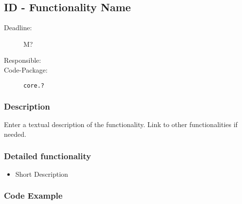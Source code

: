 \newpage
\subsection{ID - Functionality Name}
\label{Functionality:ID}

\begin{description}
\item[Deadline:] M?
\item[Responsible:]
\item[Code-Package:] \texttt{core.?}
\end{description}

\subsubsection*{Description}

Enter a textual description of the functionality. Link to other functionalities if needed. 


\subsubsection*{Detailed functionality}

\begin{itemize}
\item Short Description
\end{itemize}


\subsubsection*{Code Example}
